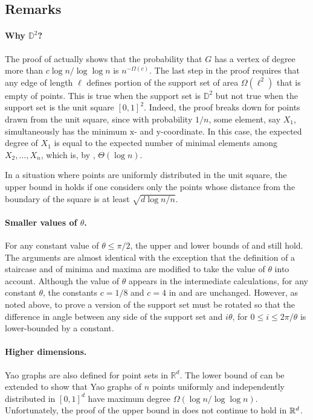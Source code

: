 \documentclass[10pt]{llncs}
\newcommand{\RR}{\mathbb{R}}
\newcommand{\D}{\mathbb{D}}
\begin{document}
\subsection{Remarks}

\paragraph{Why $\D^2$?} 
The proof of  actually shows that the
probability that $G$ has a vertex of degree more than $c\log n/\log\log n$
is $n^{-\Omega(c)}$.  The last step in the proof requires that any edge of
length $\ell$ defines portion of the support set of area $\Omega(\ell^2)$
that is empty of points.  This is true when the support set is $\D^2$
but not true when the support set is the unit square $[0,1]^2$.
Indeed, the proof breaks down for points drawn from the unit square,
since with probability $1/n$, some element, say $X_1$, simultaneously
has the minimum $\mathrm x$- and $\mathrm y$-coordinate.  In this case,
the expected degree of $X_1$ is equal to the expected number of minimal
elements among $X_2,\ldots,X_n$, which is, by , $\Theta(\log n)$.

In a situation where points are uniformly distributed in the unit square,
the upper bound in  holds if one considers only
the points whose distance from the boundary of the square is at least
$\sqrt{d\log n/n}$.

\paragraph{Smaller values of $\theta$.}
For any constant value of $\theta \le \pi /2$, the upper and lower bounds
of  and 
still hold.  The arguments are almost identical with the exception that
the definition of a staircase and of minima and maxima are modified to
take the value of $\theta$ into account.  Although the value of $\theta$
appears in the intermediate calculations, for any constant $\theta$,
the constants $c=1/8$ and $c=4$ in 
and  are unchanged.  However, as noted above,
to prove a version of  the support set
must be rotated so that the difference in angle between any side of the
support set and $i\theta$, for $0\le i\le 2\pi/\theta$ is lower-bounded
by a constant.


\paragraph{Higher dimensions.}  
Yao graphs are also defined for point sets in $\RR^d$.  The lower bound
of  can be extended to show that Yao graphs of
$n$ points uniformly and independently distributed in $[0,1]^d$ have
maximum degree $\Omega(\log n/\log\log n)$. Unfortunately, the proof of
the upper bound in  does not continue to hold
in $\mathbb{R}^d$.




\nocite{*}

\end{document}
